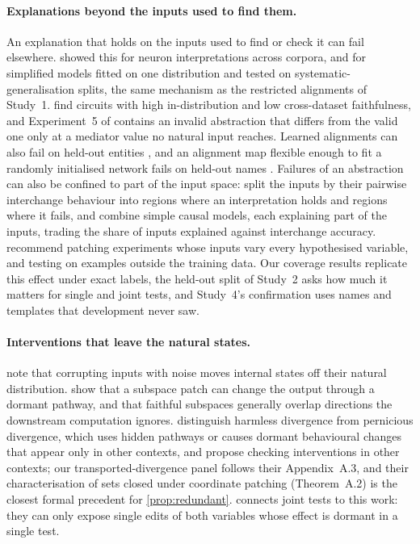 \paragraph{Explanations beyond the inputs used to find them.}
An explanation that holds on the inputs used to find or check it can fail elsewhere. \citet{bolukbasi2021illusion}
showed this for neuron interpretations across corpora, and \citet{friedman2024illusions} for simplified models
fitted on one distribution and tested on systematic-generalisation splits, the same mechanism as the restricted
alignments of Study~1. \citet{rai2026datadriven} find circuits with high in-distribution and low cross-dataset
faithfulness, and Experiment~5 of \citet{meloux2026validating} contains an invalid abstraction that differs from
the valid one only at a mediator value no natural input reaches. Learned alignments can also fail on held-out
entities \citep{huang2024ravel}, and an alignment map flexible enough to fit a randomly initialised network fails on
held-out names \citep{sutter2025nonlinear}. Failures of an abstraction can also be confined to part of the input
space: \citet{puyin2026bucketing} split the inputs by their pairwise interchange behaviour into regions where an
interpretation holds and regions where it fails, and \citet{pislar2025combining} combine simple causal models, each
explaining part of the inputs, trading the share of inputs explained against interchange accuracy.
\citet{heimersheim2024patching} recommend patching experiments whose inputs vary every hypothesised variable, and
\citet{wu2024reply} testing on examples outside the training data. Our coverage results replicate this effect under
exact labels, the held-out split of Study~2 asks how much it matters for single and joint tests, and Study~4's
confirmation uses names and templates that development never saw.

\paragraph{Interventions that leave the natural states.}
\citet{zhang2024patching} note that corrupting inputs with noise moves internal states off their natural
distribution. \citet{makelov2024subspace} show that a subspace patch can change the output through a dormant
pathway, and \citet{wu2024reply} that faithful subspaces generally overlap directions the downstream computation
ignores. \citet{grant2026divergent} distinguish harmless divergence from pernicious divergence, which uses hidden
pathways or causes dormant behavioural changes that appear only in other contexts, and propose checking interventions
in other contexts; our transported-divergence panel follows their Appendix~A.3, and their characterisation of sets
closed under coordinate patching (Theorem~A.2) is the closest formal precedent for \cref{prop:redundant}.
 connects joint tests to this work: they can only expose single edits of both variables whose
effect is dormant in a single test.


